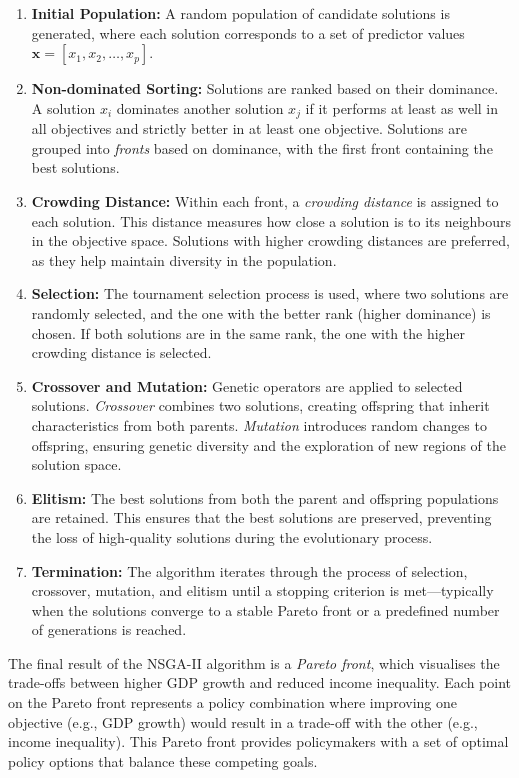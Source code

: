 \begin{enumerate}
    \item \textbf{Initial Population:} A random population of candidate solutions is generated, where each solution corresponds to a set of predictor values \( \mathbf{x} = [x_1, x_2, \dots, x_p] \).
    \item \textbf{Non-dominated Sorting:} Solutions are ranked based on their dominance. A solution \(x_i\) dominates another solution \(x_j\) if it performs at least as well in all objectives and strictly better in at least one objective. Solutions are grouped into \textit{fronts} based on dominance, with the first front containing the best solutions.
    \item \textbf{Crowding Distance:} Within each front, a \textit{crowding distance} is assigned to each solution. This distance measures how close a solution is to its neighbours in the objective space. Solutions with higher crowding distances are preferred, as they help maintain diversity in the population.
    \item \textbf{Selection:} The tournament selection process is used, where two solutions are randomly selected, and the one with the better rank (higher dominance) is chosen. If both solutions are in the same rank, the one with the higher crowding distance is selected.
    \item \textbf{Crossover and Mutation:} Genetic operators are applied to selected solutions. \textit{Crossover} combines two solutions, creating offspring that inherit characteristics from both parents. \textit{Mutation} introduces random changes to offspring, ensuring genetic diversity and the exploration of new regions of the solution space.
    \item \textbf{Elitism:} The best solutions from both the parent and offspring populations are retained. This ensures that the best solutions are preserved, preventing the loss of high-quality solutions during the evolutionary process.
    \item \textbf{Termination:} The algorithm iterates through the process of selection, crossover, mutation, and elitism until a stopping criterion is met—typically when the solutions converge to a stable Pareto front or a predefined number of generations is reached.
\end{enumerate}

The final result of the NSGA-II algorithm is a \textit{Pareto front}, which visualises the trade-offs between higher GDP growth and reduced income inequality. Each point on the Pareto front represents a policy combination where improving one objective (e.g., GDP growth) would result in a trade-off with the other (e.g., income inequality). This Pareto front provides policymakers with a set of optimal policy options that balance these competing goals.


